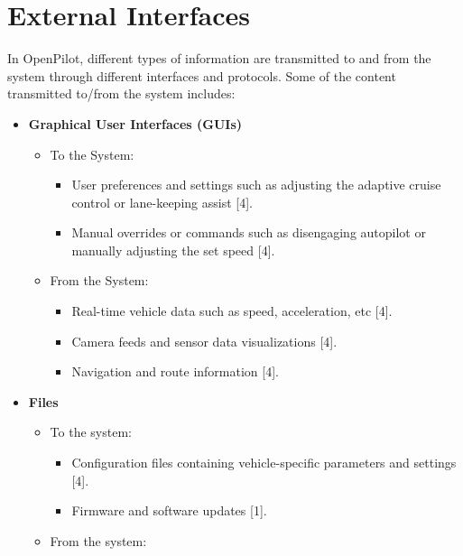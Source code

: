 \documentclass[12pt]{article}
\begin{document}
\section{External Interfaces}

In OpenPilot, different types of information are transmitted to and from the system through different interfaces and protocols. Some of the content transmitted to/from the system includes:

\begin{itemize}
    \item \textbf{Graphical User Interfaces (GUIs)}
    \begin{itemize}
        \item To the System: 
        \begin{itemize}
            \item[] User preferences and settings such as adjusting the adaptive cruise control or lane-keeping assist [4]. 
            
            \item[] Manual overrides or commands such as disengaging autopilot or manually adjusting the set speed [4].
        \end{itemize}
        

        \item From the System: 

        \begin{itemize}
            \item[] Real-time vehicle data such as speed, acceleration, etc [4].
            \item[] Camera feeds and sensor data visualizations [4].
            \item[] Navigation and route information [4].
        \end{itemize}
    \end{itemize}

    \item \textbf{Files}
    \begin{itemize}
        \item To the system:
        \begin{itemize}
            \item[] Configuration files containing vehicle-specific parameters and settings [4].
            \item[] Firmware and software updates [1].

        \end{itemize}

        
        \item From the system:


\end{itemize}
\end{itemize}
\end{document}
